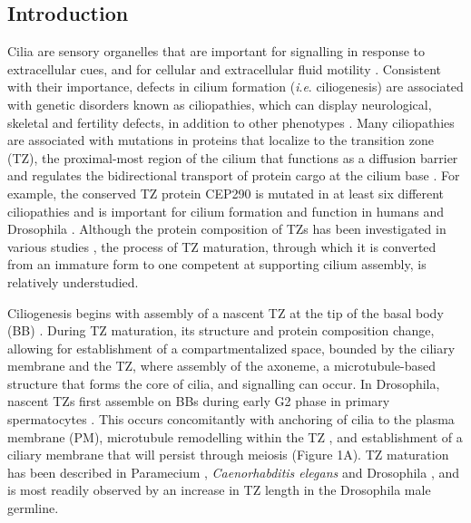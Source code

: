 \documentclass[12pt, twoside, letterpaper]{article}
\newcommand{\ie}{\textit{i}.\textit{e}.}
\begin{document}
\begin{doublespacing}
\begin{linenumbers}
    \section*{Introduction}
    Cilia are sensory organelles that are important for
    signalling in response to extracellular cues,
    and for cellular and extracellular fluid motility
    \citep{satir2010primary, marshall2006cilia, eley2005cilia, brooks2014multiciliated}.
    Consistent with their importance,
    defects in cilium formation (\ie{} ciliogenesis) are associated with genetic disorders
    known as ciliopathies, which can display
    neurological, skeletal and fertility defects, in addition to other phenotypes
    \citep{waters2011ciliopathies, valente2014primary, hammarsjo2017novel, inaba2016sperm}.
    Many ciliopathies are associated with mutations in proteins that localize
    to the transition zone (TZ), the proximal-most region of the cilium that
    functions as a diffusion barrier and regulates the
    bidirectional transport of protein cargo at the cilium base
    \citep{reiter2012base, szymanska2012transition}.
    For example, the conserved TZ protein CEP290 is mutated in at least
    six different ciliopathies
    \citep{rachel2012photoreceptor}
    and is important for cilium formation
    and function in humans \citep{shimada2017vitro, stowe2012centriolar}
    and Drosophila \citep{basiri2014migrating}.
    Although the protein composition of TZs has been investigated in various
    studies \citep{gonccalves2017ciliary},
    the process of TZ maturation, through which it is converted from an
    immature form to one competent at supporting
    cilium assembly, is relatively understudied.

    Ciliogenesis begins with assembly of a nascent TZ at the tip of
    the basal body (BB) \citep{reiter2012base}.
    During TZ maturation, its structure and protein
    composition change, allowing for
    establishment of a compartmentalized space, bounded by the ciliary membrane
    and the TZ, where assembly of the axoneme, a microtubule-based structure
    that forms the core of cilia,
    and signalling can occur.
    In Drosophila, nascent TZs first assemble on BBs
    during early G2 phase in primary spermatocytes \citep{riparbelli2012assembly}.
    This occurs concomitantly with anchoring of cilia to the plasma membrane (PM),
    microtubule remodelling within the TZ \citep{gottardo2013cilium},
    and establishment of a
    ciliary membrane that will persist through meiosis
    \citep{riparbelli2012assembly} (Figure 1A).
    TZ maturation has been described in
    Paramecium \citep{aubusson2015transition},
    \textit{Caenorhabditis elegans} \citep{serwas2017centrioles} and
    Drosophila \citep{gottardo2013cilium},
    and is most readily observed by an increase in TZ length
    in the Drosophila male germline.


\end{linenumbers}
\end{doublespacing}
\end{document}
